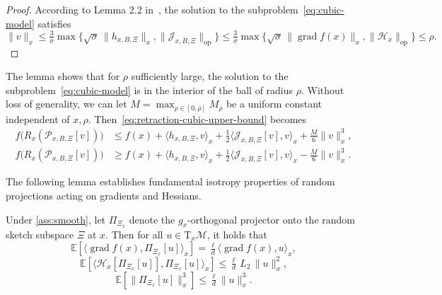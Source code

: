 \documentclass[final,onefignum,onetabnum]{siamart250211}
\DeclareMathOperator{\grad}{grad}
\begin{document}
\begin{proof}
  According to Lemma 2.2 in~\cite{cartis2011adaptive}, the solution to the subproblem~\eqref{eq:cubic-model} satisfies 
  \[
  \|v\|_x \le \tfrac{3}{\sigma} \max \{ \sqrt{\sigma}\, \|h_{x, B, \Xi}\|_x, \| \mathcal{J}_{x, B, \Xi} \|_{\mathrm{op}} \} \le \tfrac{3}{\sigma} \max \{ \sqrt{\sigma}\, \|\grad f(x)\|_x, \| \mathcal{H}_x \|_{\mathrm{op}} \} \le \rho.
  \]
  \end{proof}
  \begin{remark}
    \label{rem:cubic-upper-bound}
  The lemma shows that for $\rho$ sufficiently large, the solution to the subproblem~\eqref{eq:cubic-model} is in the interior of the ball of radius $\rho$. Without loss of generality, we can let $M = \max_{\rho \in [0, \bar \rho]} M_\rho$ be a uniform constant independent of $x, \rho$. Then~\eqref{eq:retraction-cubic-upper-bound} becomes
  \[
  \begin{aligned}
  f\big(R_x(\mathcal{P}_{x, B, \Xi} [v])\big) &\le f(x)+\langle h_{x, B, \Xi},v\rangle_x+\tfrac{1}{2}\langle \mathcal{J}_{x, B, \Xi} [v],v\rangle_x+\tfrac{M}{6}\|v\|_x^{3} ,\\
  f\big(R_x(\mathcal{P}_{x, B, \Xi} [v])\big) &\ge f(x)+\langle h_{x, B, \Xi},v\rangle_x+\tfrac{1}{2}\langle \mathcal{J}_{x, B, \Xi} [v],v\rangle_x - \tfrac{M}{6}\|v\|_x^{3}.
  \end{aligned}
  \]
  \end{remark}


  The following lemma establishes fundamental isotropy properties of random projections acting on gradients and Hessians.

  \begin{lemma}\label{lem:isotropy-identities}
  Under \cref{ass:smooth}, let $\Pi_{\Xi_x}$ denote the $g_x$-orthogonal projector onto the random sketch subspace $\Xi$ at $x$. Then for all $u \in \mathrm{T}_x\mathcal{M}$, it holds that
  \[
  \mathbb{E}\left[\langle \grad f(x),\Pi_{\Xi_x} [u]\rangle_x\right]=\tfrac{\ell}{d}\langle \grad f(x),u\rangle_x,
  \]
  \[
  \mathbb{E}\left[\langle \mathcal{H}_x[\Pi_{\Xi_x}[u]],\Pi_{\Xi_x}[u]\rangle_x\right]\le\tfrac{\ell}{d}\,L_2\,\|u\|_x^{2},
  \]
  \[
  \mathbb{E}\left[\|\Pi_{\Xi_x} [u]\|_x^{3}\right]\le \tfrac{\ell}{d}\|u\|_x^{3}.
  \]
  \end{lemma}
  
\end{document}
